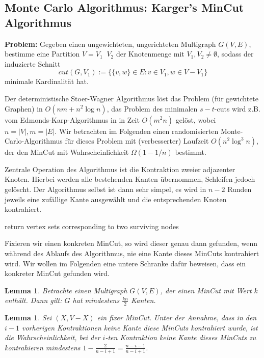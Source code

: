 \documentclass{article}
\newtheorem{lem}[thm]{Lemma}
\begin{document}
\subsection{Monte Carlo Algorithmus: Karger's MinCut Algorithmus}
{\bf Problem:} Gegeben einen ungewichteten, ungerichteten Multigraph $G(V,E)$, bestimme eine Partition $V=V_1 \mathop{\dot\cup} V_2$ der Knotenmenge mit $V_1,V_2\neq \emptyset$, sodass der induzierte Schnitt $$cut(G, V_1):=\bigl\{\{v,w\}\in E: v\in V_1, w\in V-V_1 \bigr\}$$ minimale Kardinalität hat.

Der deterministische Stoer-Wagner Algorithmus löst das Problem (für gewichtete Graphen) in $O(nm+  n^2\log n)$, das Problem des minimalen $s-t$-cuts wird z.B. vom Edmonds-Karp-Algorithmus in in Zeit $O(m^2n)$ gelöst, wobei $n=|V|, m=|E|$. Wir betrachten im Folgenden einen randomisierten Monte-Carlo-Algorithmus für dieses Problem mit (verbesserter) Laufzeit $O(n^2 \log^3 n)$, der den MinCut mit Wahrscheinlichkeit $\Omega(1-1/n)$ bestimmt.

Zentrale Operation des Algorithmus ist die Kontraktion zweier adjazenter Knoten. Hierbei werden alle bestehenden Kanten übernommen, Schleifen jedoch gelöscht. Der Algorithmus selbst ist dann sehr simpel, es wird in $n-2$ Runden jeweils eine zufällige Kante ausgewählt und die entsprechenden Knoten kontrahiert.

\begin{algorithm}
	return vertex sets corresponding to two surviving nodes
\end{algorithm}

Fixieren wir einen konkreten MinCut, so wird dieser genau dann gefunden, wenn während des Ablaufs des Algorithmus, nie eine Kante dieses MinCuts kontrahiert wird. Wir wollen im Folgenden eine untere Schranke dafür beweisen, dass ein konkreter MinCut gefunden wird.

\begin{lem}
	Betrachte einen Multigraph $G(V,E)$, der einen MinCut mit Wert $k$ enthält. Dann gilt: $G$ hat mindestens $\frac{kn}{2}$ Kanten.

\end{lem}

\begin{lem}
	Sei $(X,V-X)$ ein fixer MinCut. Unter der Annahme, dass in den $i-1$ vorherigen Kontraktionen keine Kante diese MinCuts kontrahiert wurde, ist die Wahrscheinlichkeit, bei der $i$-ten Kontraktion keine Kante dieses MinCuts zu kontrahieren mindestens $1-\frac{2}{n-i+1}=\frac{n-i-1}{n-i+1}$. 
\end{lem}
\end{document}
